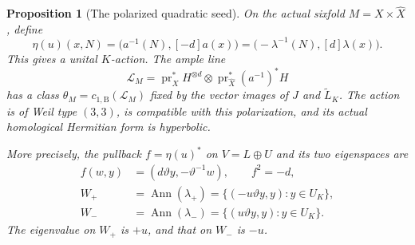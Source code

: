 \documentclass[11pt]{article}
\newtheorem{proposition}[theorem]{Proposition}
\numberwithin{equation}{section}
\begin{document}
\begin{proposition}[The polarized quadratic seed]
\label{p3sw:polarized-seed}
On the actual sixfold \(M=X\times\widehat X\), define
\[
 \eta(u)(x,N)=\bigl(a^{-1}(N),[-d]a(x)\bigr)
             =\bigl(-\lambda^{-1}(N),[d]\lambda(x)\bigr).
\]
This gives a unital \(K\)-action.  The ample line
\[
 \mathscr L_M=\operatorname{pr}_X^*H^{\otimes d}
          \otimes\operatorname{pr}_{\widehat X}^*(a^{-1})^*H
\]
has a class \(\theta_M=c_{1,\mathrm B}(\mathscr L_M)\) fixed by the
vector images of \(J\) and \(\widetilde L_K\).  The action is of Weil
type \((3,3)\), is compatible with this polarization, and its actual
homological Hermitian form is hyperbolic.

More precisely, the pullback \(f=\eta(u)^*\) on \(V=L\oplus U\) and
its two eigenspaces are
\begin{equation}
\label{p3sw:spin-eq:oriented-action}
 \begin{split}
 f(w,y)&=(d\vartheta y,-\vartheta^{-1}w),\qquad f^2=-d,\\
 W_+&=\operatorname{Ann}(\lambda_+)
       =\{(-u\vartheta y,y):y\in U_K\},\\
 W_-&=\operatorname{Ann}(\lambda_-)
       =\{(u\vartheta y,y):y\in U_K\}.
 \end{split}
\end{equation}
The eigenvalue on \(W_+\) is \(+u\), and that on \(W_-\) is \(-u\).
\end{proposition}
\end{document}
